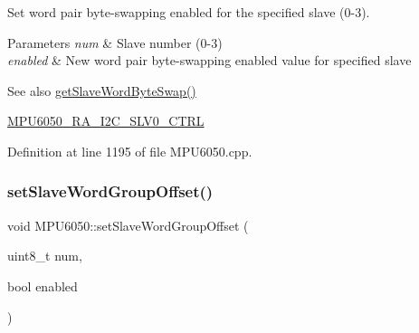 Set word pair byte-\/swapping enabled for the specified slave (0-\/3). 
\begin{DoxyParams}{Parameters}
{\em num} & Slave number (0-\/3) \\
\hline
{\em enabled} & New word pair byte-\/swapping enabled value for specified slave \\
\hline
\end{DoxyParams}
\begin{DoxySeeAlso}{See also}
\mbox{\hyperlink{classMPU6050_a18e8f3d053a68f0e5ecf497c87ecac8a}{get\+Slave\+Word\+Byte\+Swap()}} 

\mbox{\hyperlink{MPU6050_8h_a70ce4d71982a1e3fb2be9b71f40da786}{M\+P\+U6050\+\_\+\+R\+A\+\_\+\+I2\+C\+\_\+\+S\+L\+V0\+\_\+\+C\+T\+RL}} 
\end{DoxySeeAlso}


Definition at line 1195 of file M\+P\+U6050.\+cpp.


\begin{DoxyCode}{0}

\end{DoxyCode}
\mbox{\label{classMPU6050_a32602ab86f70b70d3313628fc6c010ae}} 
\subsubsection{\texorpdfstring{setSlaveWordGroupOffset()}{setSlaveWordGroupOffset()}}
{\footnotesize\ttfamily void M\+P\+U6050\+::set\+Slave\+Word\+Group\+Offset (\begin{DoxyParamCaption}\item[{uint8\+\_\+t}]{num,  }\item[{bool}]{enabled }\end{DoxyParamCaption})}

